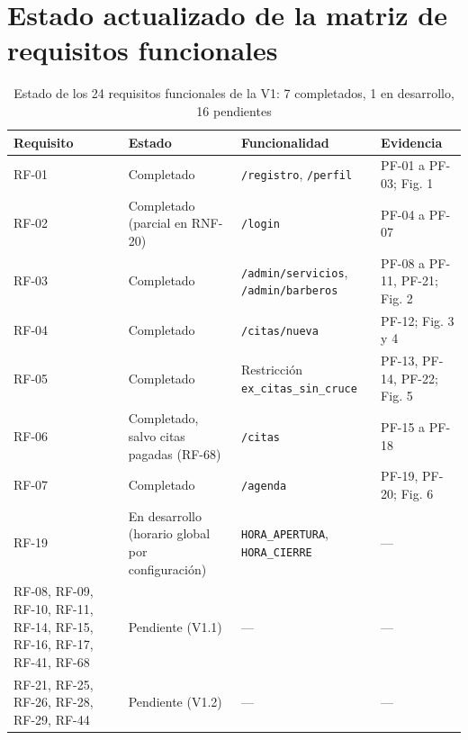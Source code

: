 \documentclass[12pt,a4paper,oneside]{article}
\begin{document}
\section{Estado actualizado de la matriz de requisitos funcionales}
\begin{table}[H]\centering\small
\begin{tabularx}{\textwidth}{>{\raggedright\arraybackslash}p{1.7cm}>{\raggedright\arraybackslash}p{2.6cm}>{\raggedright\arraybackslash}p{3.2cm}Y}\toprule
\textbf{Requisito} & \textbf{Estado} & \textbf{Funcionalidad} & \textbf{Evidencia}\\\midrule
RF-01 & Completado & \texttt{/registro}, \texttt{/perfil} & PF-01 a PF-03; Fig. 1\\
RF-02 & Completado (parcial en RNF-20) & \texttt{/login} & PF-04 a PF-07\\
RF-03 & Completado & \texttt{/admin/servicios}, \texttt{/admin/barberos} & PF-08 a PF-11, PF-21; Fig. 2\\
RF-04 & Completado & \texttt{/citas/nueva} & PF-12; Fig. 3 y 4\\
RF-05 & Completado & Restricci\'on \texttt{ex\_citas\_sin\_cruce} & PF-13, PF-14, PF-22; Fig. 5\\
RF-06 & Completado, salvo citas pagadas (RF-68) & \texttt{/citas} & PF-15 a PF-18\\
RF-07 & Completado & \texttt{/agenda} & PF-19, PF-20; Fig. 6\\
RF-19 & En desarrollo (horario global por configuraci\'on) & \texttt{HORA\_APERTURA}, \texttt{HORA\_CIERRE} & ---\\
RF-08, RF-09, RF-10, RF-11, RF-14, RF-15, RF-16, RF-17, RF-41, RF-68 & Pendiente (V1.1) & --- & ---\\
RF-21, RF-25, RF-26, RF-28, RF-29, RF-44 & Pendiente (V1.2) & --- & ---\\\bottomrule
\end{tabularx}
\caption{Estado de los 24 requisitos funcionales de la V1: 7 completados, 1 en desarrollo, 16 pendientes}\end{table}
\end{document}
